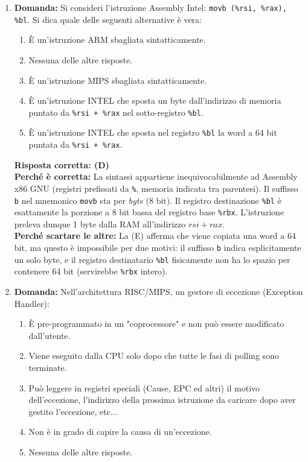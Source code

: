 \documentclass[12pt, a4paper]{article}
\begin{document}
\begin{enumerate}
    \item \textbf{Domanda:} Si consideri l'istruzione Assembly Intel: \texttt{movb (\%rsi, \%rax), \%bl}. Si dica quale delle seguenti alternative è vera:
    \begin{enumerate}[label=(\Alph*)]
        \item È un'istruzione ARM sbagliata sintatticamente.
        \item Nessuna delle altre risposte.
        \item È un'istruzione MIPS sbagliata sintatticamente.
        \item È un'istruzione INTEL che sposta un byte dall'indirizzo di memoria puntato da \texttt{\%rsi + \%rax} nel sotto-registro \texttt{\%bl}.
        \item È un'istruzione INTEL che sposta nel registro \texttt{\%bl} la word a 64 bit puntata da \texttt{\%rsi + \%rax}.
    \end{enumerate}
    \textbf{Risposta corretta: (D)} \\
    \textbf{Perché è corretta:} La sintassi appartiene inequivocabilmente ad Assembly x86 GNU (registri prefissati da \texttt{\%}, memoria indicata tra parentesi). Il suffisso \texttt{b} nel mnemonico \texttt{movb} sta per \textit{byte} (8 bit). Il registro destinazione \texttt{\%bl} è esattamente la porzione a 8 bit bassa del registro base \texttt{\%rbx}. L'istruzione preleva dunque 1 byte dalla RAM all'indirizzo $rsi + rax$. \\
    \textbf{Perché scartare le altre:} La (E) afferma che viene copiata una word a 64 bit, ma questo è impossibile per due motivi: il suffisso \texttt{b} indica esplicitamente un solo byte, e il registro destinatario \texttt{\%bl} fisicamente non ha lo spazio per contenere 64 bit (servirebbe \texttt{\%rbx} intero).

    \item \textbf{Domanda:} Nell'architettura RISC/MIPS, un gestore di eccezione (Exception Handler):
    \begin{enumerate}[label=(\Alph*)]
        \item È pre-programmato in un "coprocessore" e non può essere modificato dall'utente.
        \item Viene eseguito dalla CPU solo dopo che tutte le fasi di polling sono terminate.
        \item Può leggere in registri speciali (Cause, EPC ed altri) il motivo dell'eccezione, l'indirizzo della prossima istruzione da caricare dopo aver gestito l'eccezione, etc...
        \item Non è in grado di capire la causa di un'eccezione.
        \item Nessuna delle altre risposte.
    \end{enumerate}


\end{enumerate}
\end{document}
